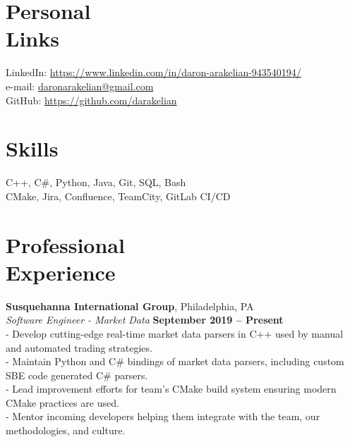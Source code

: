 \documentclass[margin,line]{resume}
\begin{document}
\begin{resume}

    \section{\mysidestyle Personal\\Links}
    \hfill LinkedIn: \url{https://www.linkedin.com/in/daron-arakelian-943540194/}          \vspace{0mm}\\\vspace{0mm}%
    \hfill e-mail: \href{mailto://daronarakelian@gmail.com}{daronarakelian@gmail.com}         \vspace{0mm}\\\vspace{0mm}%
                                                       \hfill GitHub: \url{https://github.com/darakelian} \vspace{0mm}\\\vspace{-4.5mm}%
    \section{\mysidestyle Skills} 
    C++, C\#, Python, Java, Git, SQL, Bash\vspace{1mm}\\%
    CMake, Jira, Confluence, TeamCity, GitLab CI/CD
  
    \section{\mysidestyle Professional\\Experience}
    \textbf{Susquehanna International Group}, Philadelphia, PA \vspace{2mm}\\\vspace{1mm}%
    \textsl{Software Engineer - Market Data} \hfill \textbf{September 2019 -- Present}\\
    - Develop cutting-edge real-time market data parsers in C++ used by manual and automated trading strategies.\vspace{1mm}\\%
    - Maintain Python and C\# bindings of market data parsers, including custom SBE code generated C\# parsers.\vspace{1mm}\\%
    - Lead improvement efforts for team's CMake build system ensuring modern CMake practices are used.\vspace{1mm}\\%
    - Mentor incoming developers helping them integrate with the team, our methodologies, and culture.
    

\end{resume}
\end{document}
